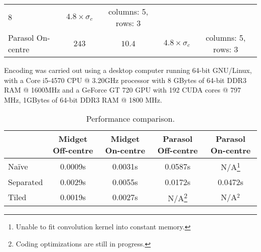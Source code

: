 \begin{table}[hb]
\begin{tabular}{l c c c c}
    $8$ & $4.8 \times \sigma_c$ & 
    \begin{minipage}{1.4cm} columns: 5, rows: 3 \end{minipage}\\
    \begin{minipage}{1.2cm} Parasol On-centre \vspace*{0.005cm}\end{minipage} & 
    \begin{minipage}{1cm}\centering $243$\end{minipage} &
    $10.4$ & $4.8 \times \sigma_c$ & 
    \begin{minipage}{1.4cm} columns: 5, rows: 3 \end{minipage}
  \end{tabular}
  \label{tab-kernel-specs}
\end{table}

Encoding was carried out using a desktop computer running 64-bit 
GNU/Linux, with a Core i5-4570 CPU @ 3.20GHz processor with 8 GBytes of 64-bit 
DDR3 RAM @ 1600MHz and a GeForce GT 720 GPU with 192 CUDA cores @ 797 MHz, 
1GBytes of 64-bit DDR3 RAM @ 1800 MHz. %

\begin{table}[hbt]
  \begin{center}
    \caption{Performance comparison.}
    \bgroup
    \def\arraystretch{1.2}
    \begin{tabular}{l c c c c}
      &
      \begin{minipage}{1.2cm}Midget Off-centre\vspace*{0.05cm}\end{minipage} & 
      \begin{minipage}{1.2cm}Midget On-centre\vspace*{0.05cm}\end{minipage}& 
      \begin{minipage}{1.2cm}Parasol Off-centre\vspace*{0.05cm}\end{minipage}& 
      \begin{minipage}{1.2cm}Parasol On-centre\vspace*{0.05cm}\end{minipage}\\
      \hline 
      Naïve     & 0.0009s & 0.0031s & 0.0587s & N/A\footnote{Unable to fit convolution kernel into constant memory.} \\ 
      Separated & 0.0029s & 0.0055s & 0.0172s & 0.0472s \\ 
      Tiled     & 0.0019s & 0.0027s & N/A\footnote{ Coding optimizations are still in progress.} & N/A$^2$
    \end{tabular} 
    \egroup
  \end{center}
\end{table}

